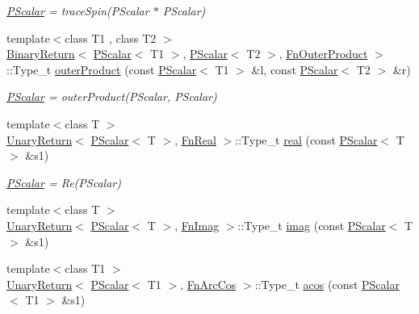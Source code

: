 \begin{DoxyCompactItemize}
\begin{DoxyCompactList}\small\item\em \mbox{\hyperlink{classENSEM_1_1PScalar}{P\+Scalar}} = trace\+Spin(\+P\+Scalar $\ast$ P\+Scalar) \end{DoxyCompactList}\item 
{\footnotesize template$<$class T1 , class T2 $>$ }\\\mbox{\hyperlink{structENSEM_1_1BinaryReturn}{Binary\+Return}}$<$ \mbox{\hyperlink{classENSEM_1_1PScalar}{P\+Scalar}}$<$ T1 $>$, \mbox{\hyperlink{classENSEM_1_1PScalar}{P\+Scalar}}$<$ T2 $>$, \mbox{\hyperlink{structENSEM_1_1FnOuterProduct}{Fn\+Outer\+Product}} $>$\+::Type\+\_\+t \mbox{\hyperlink{group__primscalar_gaa87ddc7f8a5ec9fc1cb807c54d727128}{outer\+Product}} (const \mbox{\hyperlink{classENSEM_1_1PScalar}{P\+Scalar}}$<$ T1 $>$ \&l, const \mbox{\hyperlink{classENSEM_1_1PScalar}{P\+Scalar}}$<$ T2 $>$ \&r)
\begin{DoxyCompactList}\small\item\em \mbox{\hyperlink{classENSEM_1_1PScalar}{P\+Scalar}} = outer\+Product(\+P\+Scalar, P\+Scalar) \end{DoxyCompactList}\item 
{\footnotesize template$<$class T $>$ }\\\mbox{\hyperlink{structENSEM_1_1UnaryReturn}{Unary\+Return}}$<$ \mbox{\hyperlink{classENSEM_1_1PScalar}{P\+Scalar}}$<$ T $>$, \mbox{\hyperlink{structENSEM_1_1FnReal}{Fn\+Real}} $>$\+::Type\+\_\+t \mbox{\hyperlink{group__primscalar_gac01f1564e4c432779ff00f12778275cf}{real}} (const \mbox{\hyperlink{classENSEM_1_1PScalar}{P\+Scalar}}$<$ T $>$ \&s1)
\begin{DoxyCompactList}\small\item\em \mbox{\hyperlink{classENSEM_1_1PScalar}{P\+Scalar}} = Re(\+P\+Scalar) \end{DoxyCompactList}\item 
{\footnotesize template$<$class T $>$ }\\\mbox{\hyperlink{structENSEM_1_1UnaryReturn}{Unary\+Return}}$<$ \mbox{\hyperlink{classENSEM_1_1PScalar}{P\+Scalar}}$<$ T $>$, \mbox{\hyperlink{structENSEM_1_1FnImag}{Fn\+Imag}} $>$\+::Type\+\_\+t \mbox{\hyperlink{group__primscalar_ga81e1ff1466afc27ec3d09728fc37d340}{imag}} (const \mbox{\hyperlink{classENSEM_1_1PScalar}{P\+Scalar}}$<$ T $>$ \&s1)
\item 
{\footnotesize template$<$class T1 $>$ }\\\mbox{\hyperlink{structENSEM_1_1UnaryReturn}{Unary\+Return}}$<$ \mbox{\hyperlink{classENSEM_1_1PScalar}{P\+Scalar}}$<$ T1 $>$, \mbox{\hyperlink{structENSEM_1_1FnArcCos}{Fn\+Arc\+Cos}} $>$\+::Type\+\_\+t \mbox{\hyperlink{group__primscalar_gac925d7a5363870efbfc14f80cbe15d63}{acos}} (const \mbox{\hyperlink{classENSEM_1_1PScalar}{P\+Scalar}}$<$ T1 $>$ \&s1)

\end{DoxyCompactItemize}
